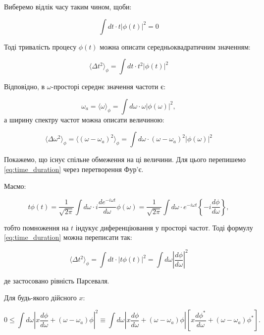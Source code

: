 Виберемо відлік часу таким чином, щоби:

\begin{equation*}
\int dt \cdot t |\phi(t)|^2 = 0
\end{equation*}

Тоді тривалість процесу \( \phi(t) \) можна описати середньоквадратичним значенням:

\begin{equation}
\langle \Delta t^2 \rangle_{\phi} = \int dt \cdot t^2 |\phi(t)|^2
\label{eq:time_duration}
\end{equation}

Відповідно, в \( \omega \)-просторі середнє значення частоти є:

\begin{equation*}
\omega_a = \langle \omega \rangle_{\phi} = \int d\omega \cdot \omega |\phi(\omega)|^2,
\end{equation*}
а ширину спектру частот можна описати величиною:

\begin{equation}
\langle \Delta \omega^2 \rangle_{\phi} = \langle (\omega - \omega_a)^2 \rangle_{\phi} = \int d\omega \cdot (\omega - \omega_a)^2 |\phi(\omega)|^2
\label{eq:frequency_width}
\end{equation}

Покажемо, що існує спільне обмеження на ці величини. Для цього перепишемо \eqref{eq:time_duration} через перетворення Фур’є.

Маємо:

\begin{equation*}
t \phi(t) = \frac{1}{\sqrt{2\pi}} \int d\omega \cdot i \frac{d e^{-i\omega t}}{d\omega} \phi(\omega) = \frac{1}{\sqrt{2\pi}} \int d\omega \cdot
e^{-i\omega t} \left\{ -i \frac{d\phi}{d\omega} \right\},
\end{equation*}

тобто помноження на \( t \) індукує диференціювання у просторі частот. Тоді формулу \eqref{eq:time_duration} можна переписати так:

\begin{equation}
\langle \Delta t^2 \rangle_{\phi} = \int dt \cdot |t \phi(t)|^2 = \int d\omega \left| \frac{d\phi}{d\omega} \right|^2
\label{eq:time_duration_fourier}
\end{equation}

де застосовано рівність Парсеваля.

Для будь-якого дійсного \( x \):

\begin{equation*}
0 \leq \int d\omega \left| x \frac{d\phi}{d\omega} + (\omega - \omega_a) \phi \right|^2 \equiv \int d\omega \left| x \frac{d\phi}{d\omega} + (\omega -
\omega_a) \phi \right| \left[ x \frac{d\phi^{*}}{d\omega} + (\omega - \omega_a) \phi^{*} \right].
\end{equation*}

